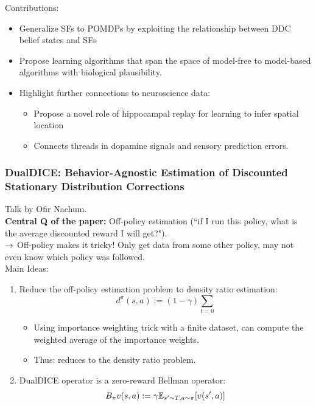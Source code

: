 Contributions:
\begin{itemize}
    \item Generalize SFs to POMDPs by exploiting the relationship between DDC belief states and SFs
    \item Propose learning algorithms that span the space of model-free to model-based algorithms with biological plausibility.
    \item Highlight further connections to neuroscience data:
    \begin{itemize}
        \item Propose a novel role of hippocampal replay for learning to infer spatial location
        \item Connects threads in dopamine signals and sensory prediction errors.
    \end{itemize}
\end{itemize}

\spacerule
\subsubsection{DualDICE: Behavior-Agnostic Estimation of Discounted Stationary Distribution Corrections \cite{nachum2019dualdice}}

Talk by Ofir Nachum. \\

{\bf Central Q of the paper:} Off-policy estimation (``if I run this policy, what is the average discounted reward I will get?"). \\

$\rightarrow$ Off-policy makes it tricky! Only get data from some other policy, may not even know which policy was followed. \\

Main Ideas:
\begin{enumerate}
    \item Reduce the off-policy estimation problem to density ratio estimation:
    \[
    d^\pi(s,a) := (1-\gamma) \sum_{t=0}
    \]
    \begin{itemize}
        \item Using importance weighting trick with a finite dataset, can compute the weighted average of the importance weights.
        \item Thus: reduces to the density ratio problem.
    \end{itemize}
    \item DualDICE operator is a zero-reward Bellman operator:
    \[
    B_\pi v(s,a) := \gamma \mathbb{E}_{s' \sim T, a \sim \pi}[v(s',a)]
    \]
\end{enumerate}

